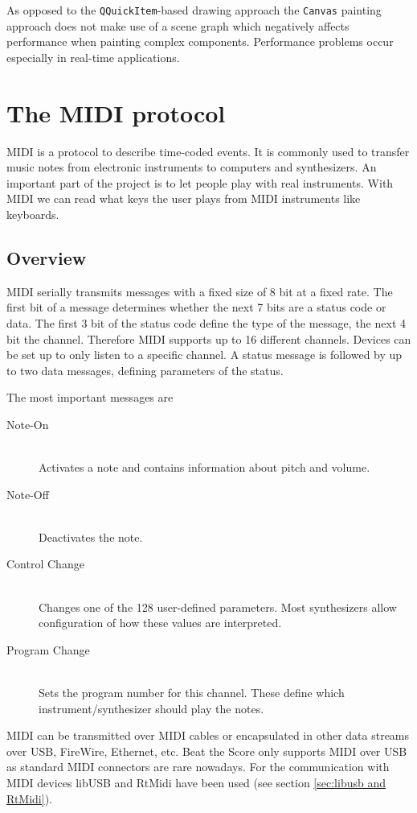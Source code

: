 As opposed to the {\tt QQuickItem}-based drawing approach the {\tt Canvas} painting approach does not make use of a scene graph which negatively affects performance when painting complex components. Performance problems occur especially in real-time applications.

\section[The MIDI protocol \textsuperscript{Kugler}]{The MIDI protocol}
\gls{MIDI} is a protocol to describe time-coded events. It is commonly used to transfer music notes from electronic instruments to computers and synthesizers. An important part of the project is to let people play with real instruments. With \gls{MIDI} we can read what keys the user plays from MIDI instruments like keyboards.

\subsection{Overview}
\gls{MIDI} serially transmits messages with a fixed size of 8 bit at a fixed rate. The first bit of a message determines whether the next 7 bits are a status code or data. The first 3 bit of the status code define the type of the message, the next 4 bit the channel. Therefore \gls{MIDI} supports up to 16 different channels. Devices can be set up to only listen to a specific channel. A status message is followed by up to two data messages, defining parameters of the status.

The most important messages are 
\begin{description}
	\item[Note-On] \hfill \\ Activates a note and contains information about pitch and volume.
	\item[Note-Off] \hfill \\ Deactivates the note.
	\item[Control Change] \hfill \\ Changes one of the 128 user-defined parameters. Most synthesizers allow configuration of how these values are interpreted.
	\item[Program Change] \hfill \\ Sets the program number for this channel. These define which instrument/synthesizer should play the notes.
\end{description}

MIDI can be transmitted over MIDI cables or encapsulated in other data streams over USB, FireWire, Ethernet, etc.
Beat the Score only supports MIDI over USB as standard MIDI connectors are rare nowadays. For the communication with MIDI devices libUSB and RtMidi have been used (see section \ref{sec:libusb and RtMidi}).

